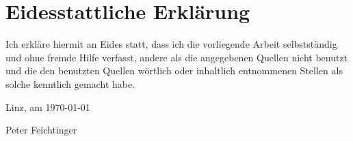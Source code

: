 \chapter{Eidesstattliche Erklärung}
\begin{otherlanguage}{ngerman}

Ich erkläre hiermit an Eides statt, dass ich die vorliegende
Arbeit selbstständig und ohne fremde Hilfe verfasst, andere als
die angegebenen Quellen nicht benutzt und die den benutzten
Quellen wörtlich oder inhaltlich entnommenen Stellen als solche
kenntlich gemacht habe.

Linz, am \today

\hfill Peter Feichtinger

\end{otherlanguage}
